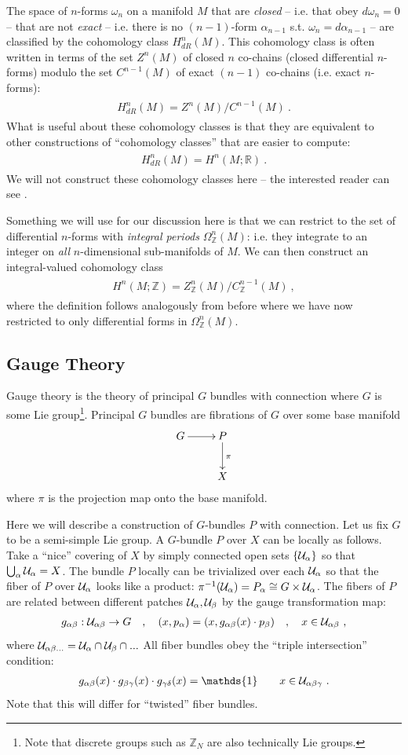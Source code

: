 \documentclass[11pt]{article}
\newcommand{\eq}[1]{\begin{align}\begin{split}#1\end{split}\end{align}}
\def\CU {{\cal U}}
\def\IR{{\mathbb{R}}}
\def\IZ{{\mathbb{Z}}}
\begin{document}
The space of $n$-forms $\omega_n$ on a manifold $M$ that are \emph{closed} -- i.e. that obey $d\omega_n=0$ -- that are not \emph{exact} -- i.e. there is no $(n-1)$-form $\alpha_{n-1}$ s.t. $\omega_n=d\alpha_{n-1}$ -- are classified by the cohomology class $H^n_{dR}(M)$. This cohomology class is often written in terms of the set $Z^n(M)$ of closed $n$ co-chains (closed differential $n$-forms) modulo the set $C^{n-1}(M)$ of exact $(n-1)$ co-chains (i.e. exact $n$-forms):
\eq{
H^n_{dR}(M)=Z^n(M)/C^{n-1}(M)~.
}
What is useful about these cohomology classes is that they are equivalent to other constructions of ``cohomology classes'' that are easier to compute:
\eq{
H^n_{dR}(M)=H^n(M;\IR)~.
}
We will not construct these cohomology classes here -- the interested reader can see \cite{Nakahara:2003nw}. 

Something we will use for our discussion here is that we can restrict to the set of differential $n$-forms with \emph{integral periods} $\Omega^n_\IZ(M)$: i.e. they integrate to an integer on \emph{all} $n$-dimensional sub-manifolds of $M$. We can then construct an integral-valued cohomology class 
\eq{
H^n(M;\IZ)=Z^n_\IZ(M)/C^{n-1}_\IZ(M)~,
}
where the definition follows analogously from before where we have now restricted to only differential forms in $\Omega_\IZ^n(M)$. 





\subsection{Gauge Theory}
Gauge theory is the theory of principal $G$ bundles with connection where $G$ is some Lie group\footnote{Note that discrete groups such as $\IZ_N$ are also technically Lie groups.}. Principal $G$ bundles are fibrations of $G$ over some base manifold 
\eq{
\xymatrix{
G\ar[r] & P\ar[d]^\pi\\
& X
}
}
where $\pi$ is the projection map onto the base manifold. 

Here we will describe a construction of $G$-bundles $P$ with connection. 
Let us fix $G$ to be a semi-simple Lie group. A $G$-bundle $P$ over $X$ can be locally as follows. Take a ``nice'' covering of $X$ by simply connected open sets $\{\CU_\alpha\}$ so that $\bigcup_\alpha \CU_\alpha=X$. The bundle $P$ locally can be trivialized over each $\CU_\alpha$ so that the fiber of $P$ over $\CU_\alpha$ looks like a product: $\pi^{-1}(\CU_\alpha)=P_\alpha\cong G\times \CU_\alpha$. The fibers of $P$ are related between different patches $\CU_\alpha, \CU_\beta$ by the gauge transformation map:
\eq{\label{overlap}
g_{\alpha\beta}:\CU_{\alpha\beta}\to G\quad, \quad (x,p_\alpha )=(x,g_{\alpha\beta}(x)\cdot p_\beta )\quad, \quad x\in \CU_{\alpha\beta}~,
}
where $\CU_{\alpha\beta...}=\CU_\alpha\cap\CU_\beta\cap...$ All fiber bundles obey the ``triple intersection'' condition:
\eq{\label{tripleintersect}
g_{\alpha\beta}(x)\cdot g_{\beta\gamma}(x)\cdot g_{\gamma \delta}(x)=\mathds{1}\qquad x\in \CU_{\alpha\beta\gamma}~.
}
Note that this will differ for ``twisted'' fiber bundles. 
\end{document}
